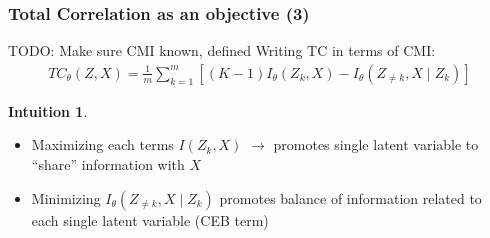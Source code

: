 \documentclass{beamer}
\theoremstyle{definition}
\newtheorem{intuition}{Intuition}
\begin{document}
    \begin{frame}
      \frametitle{Total Correlation as an objective (3)}
      TODO: Make sure CMI known, defined
      Writing TC in terms of CMI:
      \begin{align*}
        TC_{\theta}(Z, X) = \frac{1}{m}\sum_{k = 1}^{m}\left[ (K-1) I_{\theta}(Z_{k}, X) - I_{\theta}(Z_{\neq k}, X \mid Z_{k})\right]
      \end{align*}
      \begin{intuition}
       \begin{itemize}
         \item Maximizing each terms $I(Z_{k}, X)$ $\to$ promotes single latent variable to \enquote{share} information with $X$
         \item Minimizing $I_{\theta}(Z_{\neq k}, X \mid Z_{k})$ promotes balance of information related to each single latent variable (CEB term)
       \end{itemize}
      \end{intuition}
    \end{frame}
\end{document}
